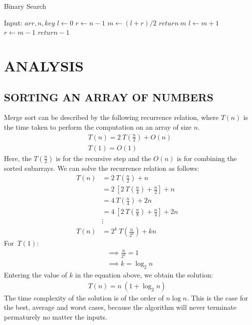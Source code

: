 \documentclass[letterpaper, 11 pt, conference]{ieeeconf}  %
\begin{document}
\begin{algorithm}
\caption{Binary Search}
\begin{algorithmic}
\State Input: $arr, n, key$
\State $l \gets 0$
\State $r \gets n-1$
    \State $m \gets (l+r)/2$
        \State $return~m$
        \State $l \gets m+1$
    \Else
        \State $r \gets m-1$
    \EndIf
\EndWhile
\State $return -1$
\end{algorithmic}
\end{algorithm}

\section{ANALYSIS}
\subsection{SORTING AN ARRAY OF NUMBERS}
Merge sort can be described by the following recurrence relation, where $T(n)$ is the time taken to perform the computation on an array of size $n$.
\begin{align*}
&T(n) = 2\ T(\frac{n}{2}) + O(n) \\
&T(1) = O(1)
\end{align*}
Here, the $T(\frac{n}{2})$ is for the recursive step and the $O(n)$ is for combining the sorted subarrays. We can solve the recurrence relation as follows:
\begin{align*}
T(n) &= 2\ T(\frac{n}{2}) + n \\
&= 2\ [2\ T(\frac{n}{4}) + \frac{n}{2}] + n \\
&= 4\ T(\frac{n}{4}) + 2n \\
&= 4\ [2\ T(\frac{n}{8}) + \frac{n}{4}] + 2n \\
&\vdots \\
T(n) &= 2^k\ T(\frac{n}{2^k}) + kn
\end{align*}
For\ $T(1)$:
\begin{align*}
&\implies \frac{n}{2^k} = 1 \\
&\implies k = \log_2 n
\end{align*}
Entering the value of $k$ in the equation above, we obtain the solution:
\begin{align*}
T(n) = n\ (1 + \log_2 n)
\end{align*}
The time complexity of the solution is of the order of $n \log n$. This is the case for the best, average and worst cases, because the algorithm will never terminate permaturely no matter the inputs.
\end{document}
